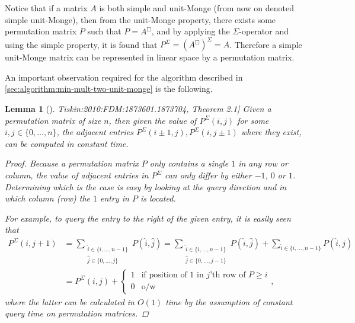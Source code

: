 \documentclass[twoside,11pt,openright]{report}
\newcommand{\reftiskin}[2]{\cite[#1]{Tiskin:2010:FDM:1873601.1873704}, #2}
\newtheorem{lemma}{Lemma}
\begin{document}
Notice that if a matrix $A$ is both simple and unit-Monge (from now on denoted simple unit-Monge), then from the unit-Monge property, there exists some permutation matrix $P$ such that $P = A^{\Box}$, and by applying the $\Sigma$-operator and using the simple property, it is found that $P^\Sigma = (A^{\Box})^{\Sigma} = A$. Therefore a simple unit-Monge matrix can be represented in linear space by a permutation matrix.

An important observation required for the algorithm described in \cref{sec:algorithm:min-mult-two-unit-monge} is the following.
\begin{lemma}[\reftiskin{p. 1288}{Theorem 2.1}]
  \label{lemma:simple-unit-monge-query-next}
  Given a permutation matrix of size $n$, then given the value of $P^{\Sigma}(i, j)$ for some $i, j \in \{0, \dots, n\}$, the adjacent entries $P^{\Sigma}(i \pm 1, j), P^{\Sigma}(i, j \pm 1)$ where they exist, can be computed in constant time.
  \begin{proof}
    Because a permutation matrix $P$ only contains a single $1$ in any row or column, the value of adjacent entries in $P^{\Sigma}$ can only differ by either $-1$, $0$ or $1$. Determining which is the case is easy by looking at the query direction and in which column (row) the $1$ entry in $P$ is located.

    For example, to query the entry to the right of the given entry, it is easily seen that
    \begin{align*}
      P^{\Sigma}(i, j + 1) &= \sum_{\substack{\hat{i} \in \{i, \dots, n - 1\} \\ \hat{j} \in \{0, \dots, j\}}} P(\hat{i}, \hat{j})
        = \sum_{\substack{\hat{i} \in \{i, \dots, n - 1\} \\ \hat{j} \in \{0, \dots, j - 1\}}} P(\hat{i}, \hat{j}) + \sum_{\hat{i} \in \{i, \dots, n - 1\}} P(\hat{i}, j) \\
        &= P^{\Sigma}(i, j) + \begin{cases}
            1  & \text{if position of $1$ in $j$'th row of $P \geq i$} \\
            0  & \text{o/w}
          \end{cases},
    \end{align*}
    where the latter can be calculated in $O(1)$ time by the assumption of constant query time on permutation matrices.
  \end{proof}
\end{lemma}
\end{document}
